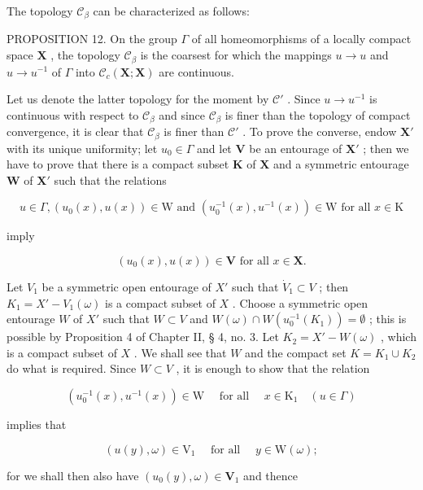 The topology \(\mathcal{C}_{\beta}\) can be characterized as follows:

PROPOSITION 12. On the group \(\Gamma\) of all homeomorphisms of a locally compact space \(\mathbf{X}\) , the topology \(\mathcal{C}_{\beta}\) is the coarsest for which the mappings \(u \to u\) and \(u \to u^{-1}\) of \(\Gamma\) into \(\mathcal{C}_c(\mathbf{X}; \mathbf{X})\) are continuous.

Let us denote the latter topology for the moment by \(\mathcal{C}'\) . Since \(u \to u^{-1}\) is continuous with respect to \(\mathcal{C}_{\beta}\) and since \(\mathcal{C}_{\beta}\) is finer than the topology of compact convergence, it is clear that \(\mathcal{C}_{\beta}\) is finer than \(\mathcal{C}'\) . To prove the converse, endow \(\mathbf{X}'\) with its unique uniformity; let \(u_0 \in \Gamma\) and let \(\mathbf{V}\) be an entourage of \(\mathbf{X}'\) ; then we have to prove that there is a compact subset \(\mathbf{K}\) of \(\mathbf{X}\) and a symmetric entourage \(\mathbf{W}\) of \(\mathbf{X}'\) such that the relations

\[
u \in \Gamma , (u _ {0} (x), u (x)) \in \mathrm{W} \text {   and   } (u _ {0} ^ {- 1} (x), u ^ {- 1} (x)) \in \mathrm{W} \text {   for   all   } x \in \mathrm{K}
\]

imply

\[
(u _ {0} (x), u (x)) \in \mathbf {V} \text {   for   all   } x \in \mathbf {X}.
\]

Let \(V_1\) be a symmetric open entourage of \(X'\) such that \(\dot{V}_1 \subset V\) ; then \(K_1 = X' - V_1(\omega)\) is a compact subset of \(X\) . Choose a symmetric open entourage \(W\) of \(X'\) such that \(W \subset V\) and \(W(\omega) \cap W(u_0^{-1}(K_1)) = \emptyset\) ; this is possible by Proposition 4 of Chapter II, § 4, no. 3. Let \(K_2 = X' - W(\omega)\) , which is a compact subset of \(X\) . We shall see that \(W\) and the compact set \(K = K_1 \cup K_2\) do what is required. Since \(W \subset V\) , it is enough to show that the relation

\[
\left(u _ {0} ^ {- 1} (x), u ^ {- 1} (x)\right) \in \mathrm{W} \quad \text { for   all } \quad x \in \mathrm{K} _ {1} \quad (u \in \Gamma)
\]

implies that

\[
(u (y), \omega) \in \mathrm{V} _ {1} \quad \text { for   all } \quad y \in \mathrm{W} (\omega);
\]

for we shall then also have \((u_0(y),\omega)\in \mathbf{V}_1\) and thence

